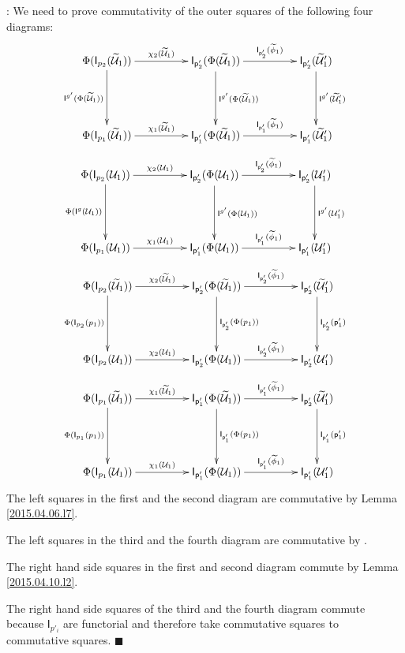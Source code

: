 \documentclass[12pt]{article}
\numberwithin{equation}{section}
\newenvironment{myproof}{{\bf Proof}:}{$\blacksquare$ \vskip 5mm }
\newcommand{\wt}{\widetilde}
\newcommand{\p}{\mathsf{p}}
\newcommand{\U}{\mathcal{U}}
\newcommand{\I}{\mathsf{I}}
\begin{document}
\begin{myproof}
We need to prove commutativity of the outer squares of the following four diagrams:
%
$$
\begin{xy}
          \xymatrix@C=4pc@R=4pc{
                 \Phi(\I_{p_2}(\wt{\U}_1))  \ar[r]^-{\chi_2(\wt{\U}_1)} \ar[d]_-{\I^{g'}(\Phi(\wt{\U}_1))} & 
                 \I_{\p_2'}(\Phi(\wt{\U}_1)) \ar[r]^-{\I_{\p_2'}(\wt{\phi}_1)} \ar[d]^-{\I^{g'}(\Phi(\wt{\U}_1))} &
		\I_{\p_2'}(\wt{\U}_1') \ar[d]^-{ \I^{g'}(\wt{\U}_1')} \\
		\Phi(\I_{p_1}(\wt{\U}_1))  \ar[r]^-{\chi_1(\wt{\U}_1)} &
		\I_{\p_1'}(\Phi(\wt{\U}_1)) \ar[r]^-{\I_{\p_1'}(\wt{\phi}_1)} &
		\I_{\p_1'}(\wt{\U}_1')
                }
\end{xy}
$$
%
$$
\begin{xy}
          \xymatrix@C=4pc@R=4pc{ \Phi(\I_{p_2}(\U_1)) \ar[r]^-{\chi_2(\U_1)}
            \ar[d]_-{\Phi(\I^g(\U_1))} & \I_{\p_2'}(\Phi(\U_1))
            \ar[r]^-{\I_{\p_2'}(\wt{\phi}_1)} \ar[d]^-{\I^{g'}(\Phi(\U_1))} &
            \I_{\p_2'}(\U_1') \ar[d]^-{\I^{g'}(\U_1')} \\ \Phi(\I_{p_1}(\U_1))
            \ar[r]^-{\chi_1(\U_1)} & \I_{\p_1'}(\Phi(\U_1))
            \ar[r]^-{\I_{\p_1'}(\wt{\phi}_1)} & \I_{\p_1'}(\U_1') }
\end{xy}
$$
%
$$
\begin{xy}
          \xymatrix@C=4pc@R=4pc{ \Phi(\I_{p_2}(\wt{\U}_1))
            \ar[r]^-{\chi_2(\wt{\U}_1)} \ar[d]_-{\Phi(\I_{p_2}(p_1))} &
            \I_{\p_2'}(\Phi(\wt{\U}_1)) \ar[r]^-{\I_{\p_2'}(\wt{\phi}_1)}
            \ar[d]^-{\I_{\p_2'}(\Phi(p_1))} & \I_{\p_2'}(\wt{\U}_1')
            \ar[d]^-{\I_{\p_2'}(\p_1')} \\ \Phi(\I_{p_2}(\U_1))
            \ar[r]^-{\chi_2(\U_1)} & \I_{\p_2'}(\Phi(\U_1))
            \ar[r]^-{\I_{\p_2'}(\wt{\phi}_1)} & \I_{\p_2'}(\U_1') }
\end{xy}
$$
%
$$
\begin{xy}
          \xymatrix@C=4pc@R=4pc{ \Phi(\I_{p_1}(\wt{\U}_1))
            \ar[r]^-{\chi_1(\wt{\U}_1)} \ar[d]_-{\Phi(\I_{p_1}(p_1))} &
            \I_{\p_1'}(\Phi(\wt{\U}_1)) \ar[r]^-{\I_{\p_1'}(\wt{\phi}_1)}
            \ar[d]^-{\I_{\p_1'}(\Phi(p_1))} & \I_{\p_2'}(\wt{\U}_1')
            \ar[d]^-{\I_{\p_1'}(\p_1')} \\ \Phi(\I_{p_1}(\U_1))
            \ar[r]^-{\chi_1(\U_1)} & \I_{\p_1'}(\Phi(\U_1))
            \ar[r]^-{\I_{\p_1'}(\wt{\phi}_1)} & \I_{\p_1'}(\U_1') }
\end{xy}
$$
%
The left squares in the first and the second diagram are commutative by Lemma
\ref{2015.04.06.l7}.

The left squares in the third and the fourth diagram are commutative by
\cite[Lemma 5.7]{fromunivwithPi}.

The right hand side squares in the first and second diagram commute by Lemma
\ref{2015.04.10.l2}.

The right hand side squares of the third and the fourth diagram commute because
$\I_{p'_i}$ are functorial and therefore take commutative squares to commutative
squares.
\end{myproof}
\end{document}

